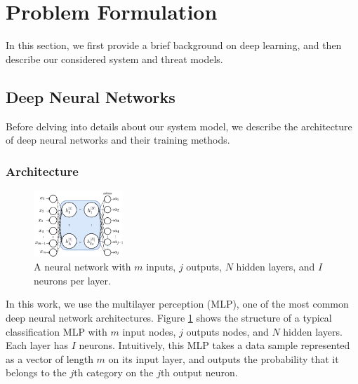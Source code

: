 \documentclass[conference]{IEEEtran}
\begin{document}
\section{Problem Formulation}
In this section, we first provide a brief background on deep learning, and then describe our considered system and threat models. 


\subsection{Deep Neural Networks}
Before delving into details about our system model, we describe the architecture of deep neural networks and their training methods. 
\subsubsection{Architecture}\label{sec:MLP}
\begin{figure}[t]
\centering
\includegraphics[width=0.3\textwidth, keepaspectratio]{SimpleNN}
\caption{A neural network with $m$ inputs, $j$ outputs,  $N$  hidden layers, and $I$ neurons per layer.}
\label{fig:SimplNN}
\end{figure}
In this work, we use the multilayer perception (MLP), one of the most common deep neural network architectures. 
Figure \ref{fig:SimplNN} shows the structure of a typical classification MLP with $m$ input nodes, $j$ outputs nodes, and  
$N$ hidden layers. Each layer has $I$ neurons. Intuitively, this MLP takes a data sample represented as a vector of length
$m$ on its input layer, and outputs the probability that it belongs to the $j$th category on the $j$th output neuron.
\end{document}
